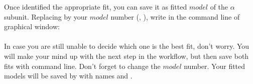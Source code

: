  Once identified the appropriate fit, you can save it as fitted $model$ of the  $\alpha$ subunit. Replacing  by your $model$ number (, ), write in the command line of \chimera graphical window:\\
  
  \\
  
In case you are still unable to decide which one is the best fit, don't worry. You will make your mind up with the next step in the workflow, but then save both fits with  \chimera command line. Don't forget to change the $model$ number. Your fitted models will be saved by \chimera with names  and .
 
